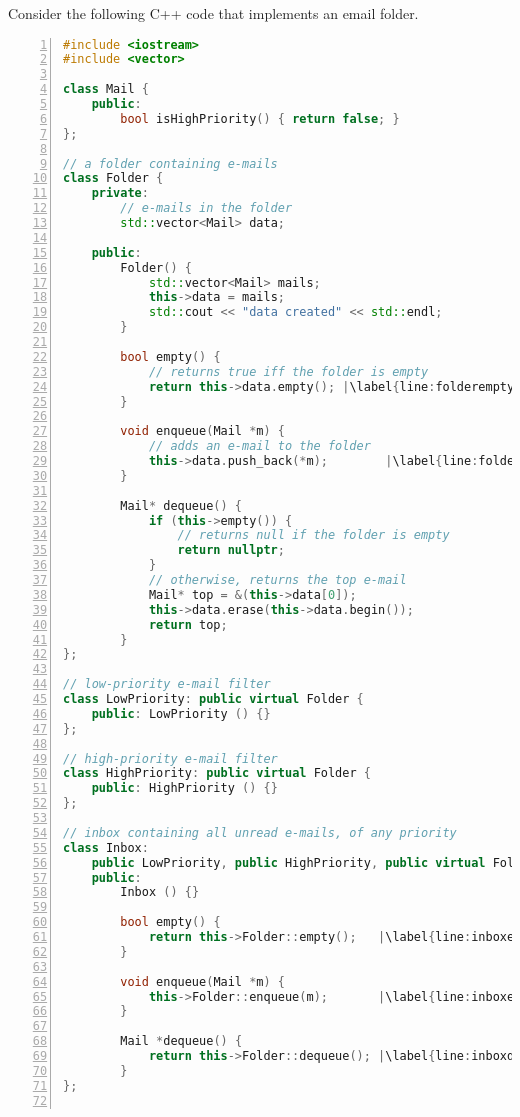 \documentclass{article}
\begin{document}
\begin{example}
  Consider the following C++ code that implements an email folder.
\begin{lstlisting}[language=C++, numbers=left, escapechar=|]
#include <iostream>
#include <vector>

class Mail {
    public:
        bool isHighPriority() { return false; }
};

// a folder containing e-mails
class Folder {
    private:
        // e-mails in the folder
        std::vector<Mail> data;

    public:
        Folder() {
            std::vector<Mail> mails;
            this->data = mails;
            std::cout << "data created" << std::endl;
        }
    
        bool empty() {
            // returns true iff the folder is empty
            return this->data.empty(); |\label{line:folderempty}|
        } 

        void enqueue(Mail *m) {
            // adds an e-mail to the folder
            this->data.push_back(*m);        |\label{line:folderenqueue}|
        }

        Mail* dequeue() {
            if (this->empty()) {
                // returns null if the folder is empty
                return nullptr;
            }
            // otherwise, returns the top e-mail
            Mail* top = &(this->data[0]);
            this->data.erase(this->data.begin());
            return top;
        }
};

// low-priority e-mail filter
class LowPriority: public virtual Folder {
    public: LowPriority () {}
};

// high-priority e-mail filter
class HighPriority: public virtual Folder {
    public: HighPriority () {}
};

// inbox containing all unread e-mails, of any priority
class Inbox:
    public LowPriority, public HighPriority, public virtual Folder {
    public:
        Inbox () {}
    
        bool empty() {
            return this->Folder::empty();   |\label{line:inboxempty}|
        }
        
        void enqueue(Mail *m) {
            this->Folder::enqueue(m);       |\label{line:inboxenqueue}|
        }
        
        Mail *dequeue() {
            return this->Folder::dequeue(); |\label{line:inboxdequeue}|
        }
};


\end{lstlisting}
\end{example}
\end{document}
